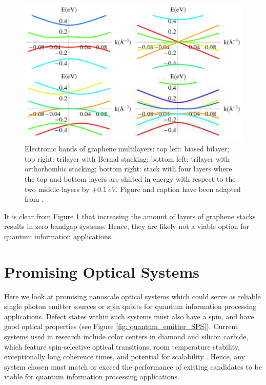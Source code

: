 \documentclass[]{article}
\begin{document}
\begin{figure}[htb]
	\centering
	\includegraphics[scale = 0.55]{graphene_stack_bands.PNG}
	\caption{Electronic bands of graphene multilayers: top left: biased bilayer; top right: trilayer with Bernal stacking; bottom left: trilayer with orthorhombic stacking; bottom right: stack with four layers where the top and bottom layers are shifted in energy with respect to the two middle layers by $+0.1 \ eV$. Figure and caption have been adapted from \cite{The_Electronic_Properties_of_Graphene}. }
	\label{fig: graphene_stack_bands}
\end{figure}

It is clear from Figure \ref{fig: graphene_stack_bands} that increasing the amount of layers of graphene stacks results in zero bandgap systems. Hence, they are likely not a viable option for quantum information applications. 


\section{Promising Optical Systems}\label{sec: Promising_Optical_Systems}
Here we look at promising nanoscale optical systems which could serve as reliable single photon emitter sources or spin qubits for quantum information processing applications.
Defect states within such systems must also have a spin, and have good optical properties (see Figure \ref{fig: quantum_emitter_SPS}). Current systems used in research include color centers in diamond and silicon carbide, which feature spin-selective optical transitions, room temperature stability, exceptionally long coherence times, and potential for scalability \cite{Single_defect_emitters_WSe2}. Hence, any system chosen must match or exceed the performance of existing candidates to be viable for quantum information processing applications.
\end{document}

